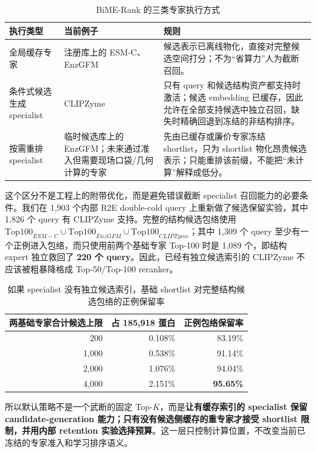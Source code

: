 \documentclass[11pt,a4paper]{ctexart}
\begin{document}
\begin{table}[htbp]
\centering
\small
\caption{BiME-Rank 的三类专家执行方式}
\begin{tabularx}{\textwidth}{@{}L{37mm}L{39mm}Y@{}}
\toprule
\textbf{执行类型} & \textbf{当前例子} & \textbf{规则}\\
\midrule
全局缓存专家 & 注册库上的 ESM-C、EnzGFM & 候选表示已离线物化，直接对完整候选空间打分；不为“省算力”人为截断召回。\\
条件式候选生成 specialist & CLIPZyme & 只有 query 和候选结构资产都支持时激活；候选 embedding 已缓存，因此允许在全部支持候选中独立召回，缺失时精确回退到冻结的非结构排序。\\
按需重排 specialist & 临时候选库上的 EnzGFM；未来通过准入但需要现场口袋/几何计算的专家 & 先由已缓存或廉价专家冻结 shortlist，只为 shortlist 物化昂贵候选表示；只能重排该前缀，不能把“未计算”解释成低分。\\
\bottomrule
\end{tabularx}
\end{table}

这个区分不是工程上的附带优化，而是避免错误截断 specialist 召回能力的必要条件。我们在 1,903 个内部 R2E double-cold query 上重新做了候选保留实验，其中 1,826 个 query 有 CLIPZyme 支持。完整的结构候选包络使用 $\mathrm{Top100}_{ESM-C}\cup\mathrm{Top100}_{EnzGFM}\cup\mathrm{Top100}_{CLIPZyme}$；其中 1,309 个 query 至少有一个正例进入包络，而只使用前两个基础专家 Top-100 时是 1,089 个，即结构 expert 独立救回了 \textbf{220 个 query}。因此，已经有独立候选索引的 CLIPZyme 不应该被粗暴降格成 Top-50/Top-100 reranker。

\begin{table}[htbp]
\centering
\caption{如果 specialist 没有独立候选索引，基础 shortlist 对完整结构候选包络的正例保留率}
\begin{tabular}{rrr}
\toprule
\textbf{两基础专家合计候选上限} & \textbf{占 185,918 蛋白} & \textbf{正例包络保留率}\\
\midrule
200 & 0.108\% & 83.19\%\\
1,000 & 0.538\% & 91.14\%\\
2,000 & 1.076\% & 94.04\%\\
4,000 & 2.151\% & \textbf{95.65\%}\\
\bottomrule
\end{tabular}
\end{table}

所以默认策略不是一个武断的固定 Top-$K$，而是\textbf{让有缓存索引的 specialist 保留 candidate-generation 能力；只有没有候选侧缓存的重专家才接受 shortlist 限制，并用内部 retention 实验选择预算}。这一层只控制计算位置，不改变当前已冻结的专家准入和学习排序语义。
\end{document}
